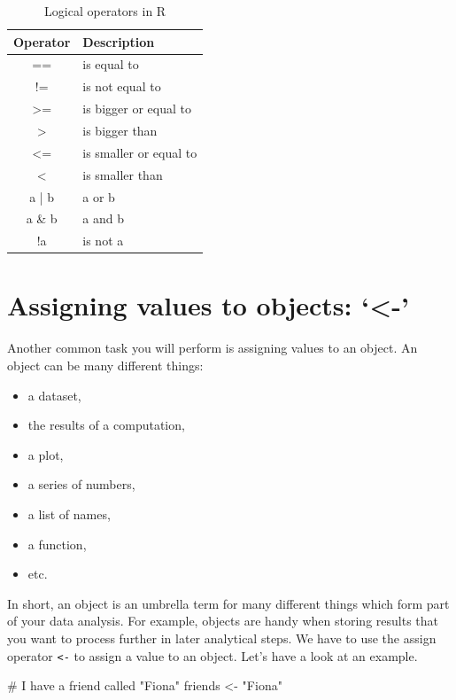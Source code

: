 \documentclass[
  letterpaper,
]{krantz}
\makeatletter
\newenvironment{Shaded}{\begin{snugshade}}{\end{snugshade}}
\newcommand{\CommentTok}[1]{\textcolor[rgb]{0.37,0.37,0.37}{#1}}
\newcommand{\NormalTok}[1]{\textcolor[rgb]{0.00,0.23,0.31}{#1}}
\newcommand{\OtherTok}[1]{\textcolor[rgb]{0.00,0.23,0.31}{#1}}
\newcommand{\StringTok}[1]{\textcolor[rgb]{0.13,0.47,0.30}{#1}}
\newenvironment{kframe}{%
\medskip{}
\setlength{\fboxsep}{.8em}
 \def\at@end@of@kframe{}%
 \ifinner\ifhmode%
  \def\at@end@of@kframe{\end{minipage}}%
  \begin{minipage}{\columnwidth}%
 \fi\fi%
 \def\FrameCommand##1{\hskip\@totalleftmargin \hskip-\fboxsep
 \colorbox{shadecolor}{##1}\hskip-\fboxsep
     \hskip-\linewidth \hskip-\@totalleftmargin \hskip\columnwidth}%
 \MakeFramed {\advance\hsize-\width
   \@totalleftmargin\z@ \linewidth\hsize
   \@setminipage}}%
 {\par\unskip\endMakeFramed%
 \at@end@of@kframe}
\renewenvironment{Shaded}{\begin{kframe}}{\end{kframe}}
\makeatother
\begin{document}
\begin{longtable}{cl}
\caption{Logical operators in R}\tabularnewline

\toprule
Operator & Description \\ 
\midrule\addlinespace[2.5pt]
== & is equal to \\ 
!= & is not equal to \\ 
>= & is bigger or equal to \\ 
> & is bigger than \\ 
<= & is smaller or equal to \\ 
< & is smaller than \\ 
a | b & a or b \\ 
a \& b & a and b \\ 
!a & is not a \\ 
\bottomrule
\end{longtable}

\section{Assigning values to objects:
`\textless-'}\label{assigning-values-to-objects}

Another common task you will perform is assigning values to an object.
An object can be many different things:

\begin{itemize}
\item
  a dataset,
\item
  the results of a computation,
\item
  a plot,
\item
  a series of numbers,
\item
  a list of names,
\item
  a function,
\item
  etc.
\end{itemize}

In short, an object is an umbrella term for many different things which
form part of your data analysis. For example, objects are handy when
storing results that you want to process further in later analytical
steps. We have to use the assign operator \texttt{\textless{}-} to
assign a value to an object. Let's have a look at an example.

\begin{Shaded}
\begin{Highlighting}[]
\CommentTok{\# I have a friend called "Fiona"}
\NormalTok{friends }\OtherTok{\textless{}{-}} \StringTok{"Fiona"}
\end{Highlighting}
\end{Shaded}
\end{document}
